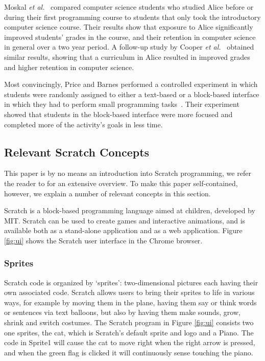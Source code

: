 \documentclass{sig-alternate}
\begin{document}
Moskal \emph{et al.}~\cite{b._moskal_evaluating_2005} compared computer science students who studied Alice before or during their first programming course to students that only took the introductory computer science course. Their results show that exposure to Alice significantly improved students' grades in the course, and their retention in computer science in general over a two year period. A follow-up study by Cooper \emph{et al.}~\cite{cooper_teaching_2003} obtained similar results, showing that a curriculum in Alice resulted in improved grades and higher retention in computer science.

Most convincingly, Price and Barnes performed a controlled experiment in which students were randomly assigned to either a text-based or a block-based interface in  which they had to perform small programming tasks~\cite{price_comparing_2015}. Their experiment showed that students in the block-based interface were more focused and completed more of the activity's goals in less time.


\subsection{Relevant Scratch Concepts}
\label{sec:scratch}
This paper is by no means an introduction into Scratch programming, we refer the reader to \cite{brennan_creative_2014} for an extensive overview. To make this paper self-contained, however, we explain a number of relevant concepts in this section. 

Scratch is a block-based programming language aimed at children, developed by MIT. Scratch can be used to create games and interactive animations, and is available both as a stand-alone application and as a web application. Figure \ref{fig:ui} shows the Scratch user interface in the Chrome browser.

\subsubsection{Sprites}
Scratch code is organized by `sprites': two-dimensional pictures each having their own associated code. Scratch allows users to bring their sprites to life in various ways, for example by moving them in the plane, having them say or think words or sentences via text balloons, but also by having them make sounds, grow, shrink and switch costumes. The Scratch program in Figure \ref{fig:ui} consists two one sprites, the cat, which is Scratch's default sprite and logo and a Piano. The code in Sprite1 will cause the cat to move right when the right arrow is pressed, and when the green flag is clicked it will continuously sense touching the piano.
\end{document}
